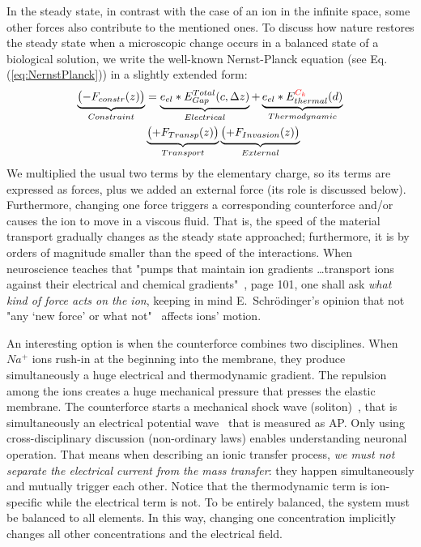 In the steady state, in contrast with the case of an ion in the infinite space, some other forces also contribute to
the mentioned ones. To discuss how nature restores the steady state when a microscopic change occurs in a
balanced state of a biological solution, we write the well-known Nernst-Planck
equation (see Eq.(\ref{eq:NernstPlanck})) in a slightly extended form:
%
\begin{align}
	\underbrace{\bigl(-F_{constr}(z)\bigr)}_{Constraint} &= \underbrace{ e_{el}*E_{Gap}^{Total}(c,\Delta z)}_{Electrical} +\underbrace{e_{el}*E_{thermal}^{\textcolor{red}{C_k}}(d)}_{Thermodynamic}\\
	&\underbrace{\bigl(+F_{Transp}(z)\bigr)}_{Transport}\underbrace{\bigl(+F_{Invasion}(z)\bigr)}_{External} 
	\label{eq:NernstPlanckExtended}
\end{align}
We multiplied the usual two terms by the elementary charge, so its terms are expressed as forces, plus we added an external force (its role is discussed below). Furthermore, changing one force triggers a corresponding counterforce and/or causes the ion to move in a viscous fluid. That is, the speed of the material transport gradually changes
as the steady state approached; furthermore, it is by orders of magnitude smaller than the speed of the interactions. 
When neuroscience teaches that "pumps that maintain
ion gradients \dots transport ions against their
electrical and chemical gradients"~\cite{PrinciplesNeuralScience:2013}, page 101, one shall ask \textit{what kind of force acts on the ion}, keeping in mind
E.~Schrödinger's opinion that not "any ‘new force’ or what not"~\cite{Schrodinger:1992} affects ions' motion.

An interesting option is when the counterforce combines two disciplines.
When $Na^+$ ions rush-in at the beginning into the membrane,
they produce simultaneously a huge electrical and thermodynamic gradient.
The repulsion among the ions creates a huge mechanical pressure
that presses the elastic membrane. The counterforce starts a mechanical 
shock wave (soliton)~\cite{SolitonPropagation:2005}, that is simultaneously
an electrical potential wave~\cite{VeghUnifiedCrossdisciplinaryModel:2026} that is measured as \gls{AP}. Only using  cross-disciplinary discussion (non-ordinary laws) enables understanding neuronal operation.  
That means when describing an ionic transfer process, \textit{we must not separate the electrical current from the mass transfer}: they happen simultaneously and mutually trigger each other. Notice that the thermodynamic term is ion-specific while the electrical term is not. To be entirely balanced, the system must be balanced to all elements. In this way, changing one concentration implicitly changes all other concentrations and the electrical field.

